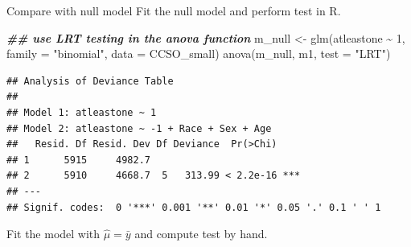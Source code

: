\documentclass[
  ignorenonframetext,
]{beamer}
\newenvironment{Shaded}{\begin{snugshade}}{\end{snugshade}}
\newcommand{\AttributeTok}[1]{\textcolor[rgb]{0.77,0.63,0.00}{#1}}
\newcommand{\DecValTok}[1]{\textcolor[rgb]{0.00,0.00,0.81}{#1}}
\newcommand{\DocumentationTok}[1]{\textcolor[rgb]{0.56,0.35,0.01}{\textbf{\textit{#1}}}}
\newcommand{\FunctionTok}[1]{\textcolor[rgb]{0.00,0.00,0.00}{#1}}
\newcommand{\NormalTok}[1]{#1}
\newcommand{\OtherTok}[1]{\textcolor[rgb]{0.56,0.35,0.01}{#1}}
\newcommand{\SpecialCharTok}[1]{\textcolor[rgb]{0.00,0.00,0.00}{#1}}
\newcommand{\StringTok}[1]{\textcolor[rgb]{0.31,0.60,0.02}{#1}}
\begin{document}
\begin{frame}[fragile]{Compare with null model}
\protect\hypertarget{compare-with-null-model}{}
Fit the null model and perform test in R.

\vspace{12pt}
\tiny

\begin{Shaded}
\begin{Highlighting}[]
\DocumentationTok{\#\# use LRT testing in the anova function }
\NormalTok{m\_null }\OtherTok{\textless{}{-}} \FunctionTok{glm}\NormalTok{(atleastone }\SpecialCharTok{\textasciitilde{}} \DecValTok{1}\NormalTok{, }\AttributeTok{family =} \StringTok{"binomial"}\NormalTok{, }\AttributeTok{data =}\NormalTok{ CCSO\_small)}
\FunctionTok{anova}\NormalTok{(m\_null, m1, }\AttributeTok{test =} \StringTok{"LRT"}\NormalTok{)}
\end{Highlighting}
\end{Shaded}

\begin{verbatim}
## Analysis of Deviance Table
## 
## Model 1: atleastone ~ 1
## Model 2: atleastone ~ -1 + Race + Sex + Age
##   Resid. Df Resid. Dev Df Deviance  Pr(>Chi)    
## 1      5915     4982.7                          
## 2      5910     4668.7  5   313.99 < 2.2e-16 ***
## ---
## Signif. codes:  0 '***' 0.001 '**' 0.01 '*' 0.05 '.' 0.1 ' ' 1
\end{verbatim}

\vspace{12pt}
\normalsize

Fit the model with \(\hat{\mu} = \bar{y}\) and compute test by hand.
\tiny

\begin{Shaded}
\end{Shaded}


\end{frame}
\end{document}
